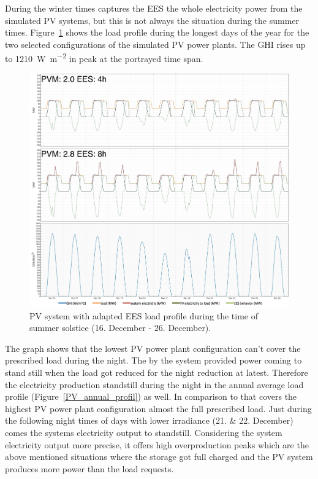 During the winter times captures the EES the whole electricity power from the simulated PV systems, but this is not always the situation during the summer times. Figure~\ref{PV_summer_load} shows the load profile during the longest days of the year for the two selected configurations of the simulated PV power plants. The GHI rises up to \SI{1210}{\watt\per\square\metre} in peak at the portrayed time span.

\begin{figure}[htbp]
\centering
\includegraphics[width=1\linewidth]{FIG/PV_summer_load}
\caption[PV system with adapted EES load profile during the time of summer solstice.]{PV system with adapted EES load profile during the time of summer solstice (16. December - 26. December).}\label{PV_summer_load}
\end{figure}
The graph shows that the lowest PV power plant configuration can't cover the prescribed load during the night. The by the system provided power coming to stand still when the load got reduced for the night reduction at latest. Therefore the electricity production standstill during the night in the annual average load profile (Figure~\ref{PV_annual_profil}) as well. In comparison to that covers the highest PV power plant configuration almost the full prescribed load. Just during the following night times of days with lower irradiance (21. \& 22. December) comes the systems electricity output to standstill. Considering the system electricity output more precise, it offers high overproduction peaks which are the above mentioned situations where the storage got full charged and the PV system produces more power than the load requests.  

